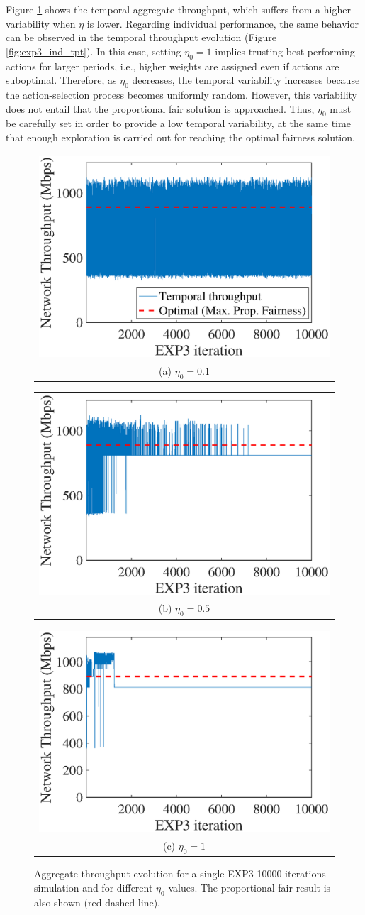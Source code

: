 \documentclass[10pt,journal,compsoc]{IEEEtran}
\begin{document}
	Figure \ref{fig:exp3_agg_tpt} shows the temporal aggregate throughput, which suffers from a higher variability when $\eta$ is lower. Regarding individual performance, the same behavior can be observed in the temporal throughput evolution (Figure \ref{fig:exp3_ind_tpt}). In this case, setting $\eta_0 = 1$ implies trusting best-performing actions for larger periods, i.e., higher weights are assigned even if actions are suboptimal. Therefore, as $\eta_0$ decreases, the temporal variability increases because the action-selection process becomes uniformly random. However, this variability does not entail that the proportional fair solution is approached. Thus, $\eta_0$ must be carefully set in order to provide a low temporal variability, at the same time that enough exploration is carried out for reaching the optimal fairness solution.
	\begin{figure}
		\centering
		\begin{tabular}{@{}c@{}}
			\includegraphics[width=.25\textwidth]{images/NEW_temporal_aggregate_tpt_EXP3_eta01} \\[\abovecaptionskip]
			\small (a) $\eta_0 = 0.1$
			\label{fig:exp3_eta01_agg_tpt}
		\end{tabular}	
		\hspace{\floatsep}	
		\begin{tabular}{@{}c@{}}
			\includegraphics[width=.25\textwidth]{images/NEW_temporal_aggregate_tpt_EXP3_eta05} \\[\abovecaptionskip]
			\small (b) $\eta_0 = 0.5$
			\label{fig:exp3_eta05_agg_tpt}
		\end{tabular}
		\hspace{\floatsep}
		\begin{tabular}{@{}c@{}}
			\includegraphics[width=.25\textwidth]{images/NEW_temporal_aggregate_tpt_EXP3_eta1} \\[\abovecaptionskip]
			\small (c) $\eta_0 = 1$
			\label{fig:exp3_eta1_agg_tpt}
		\end{tabular}
		\caption{Aggregate throughput evolution for a single EXP3 10000-iterations simulation and for different $\eta_0$ values. The proportional fair result is also shown (red dashed line).}
		\label{fig:exp3_agg_tpt}
	\end{figure}
	
\end{document}
